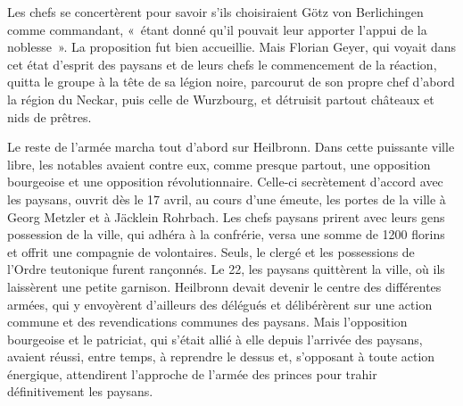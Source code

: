 \documentclass[french,twoside]{book} %
\begin{document}
Les chefs se concertèrent pour savoir s’ils choisiraient Götz von Berlichingen comme commandant, « étant donné qu’il pouvait leur apporter l’appui de la noblesse ». La proposition fut bien accueillie. Mais Florian Geyer, qui voyait dans cet état d’esprit des paysans et de leurs chefs le commencement de la réaction, quitta le groupe à la tête de sa légion noire, parcourut de son propre chef d’abord la région du Neckar, puis celle de Wurzbourg, et détruisit partout châteaux et nids de prêtres.\par
Le reste de l’armée marcha tout d’abord sur Heilbronn. Dans cette puissante ville libre, les notables avaient contre eux, comme presque partout, une opposition bourgeoise et une opposition révolutionnaire. Celle-ci secrètement d’accord avec les paysans, ouvrit dès le 17 avril, au cours d’une émeute, les portes de la ville à Georg Metzler et à Jäcklein Rohrbach. Les chefs paysans prirent avec leurs gens possession de la ville, qui adhéra à la confrérie, versa une somme de 1200 florins et offrit une compagnie de volontaires. Seuls, le clergé et les possessions de l’Ordre teutonique furent rançonnés. Le 22, les paysans quittèrent la ville, où ils laissèrent une petite garnison. Heilbronn devait devenir le centre des différentes armées, qui y envoyèrent d’ailleurs des délégués et délibérèrent sur une action commune et des revendications communes des paysans. Mais l’opposition bourgeoise et le patriciat, qui s’était allié à elle depuis l’arrivée des paysans, avaient réussi, entre temps, à reprendre le dessus et, s’opposant à toute action énergique, attendirent l’approche de l’armée des princes pour trahir définitivement les paysans.\par
\end{document}
